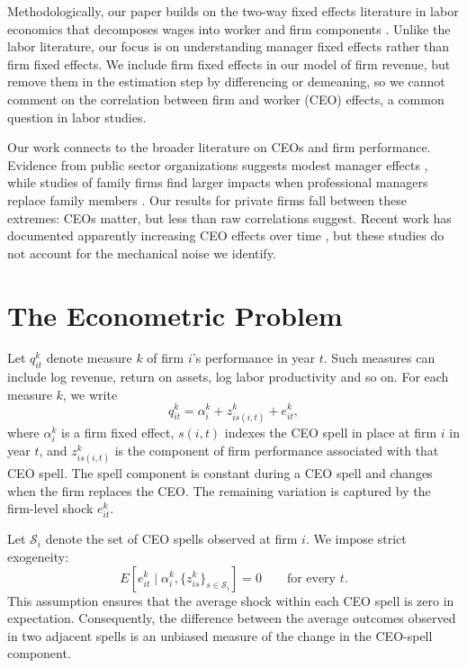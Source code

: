 \documentclass[11pt,a4paper]{article}
\begin{document}
Methodologically, our paper builds on the two-way fixed effects literature in labor economics that decomposes wages into worker and firm components \citep{Abowd1999Econometrica, Card2018JoLE}. Unlike the labor literature, our focus is on understanding manager fixed effects rather than firm fixed effects. We include firm fixed effects in our model of firm revenue, but remove them in the estimation step by differencing or demeaning, so we cannot comment on the correlation between firm and worker (CEO) effects, a common question in labor studies.

Our work connects to the broader literature on CEOs and firm performance. Evidence from public sector organizations suggests modest manager effects \citep{fenizia2022managers, janke2024role}, while studies of family firms find larger impacts when professional managers replace family members \citep{bennedsen2007inside, sraer2007performance}. Our results for private firms fall between these extremes: CEOs matter, but less than raw correlations suggest. Recent work has documented apparently increasing CEO effects over time \citep{quigley2015has}, but these studies do not account for the mechanical noise we identify. 


\section{The Econometric Problem}
\label{sec:econometric_problem}

Let $q_{it}^{k}$ denote measure $k$ of firm $i$'s performance in year
$t$. Such measures can include log
revenue, return on assets, log labor productivity and so on. For each measure
$k$, we write
\begin{equation}
q_{it}^{k}
=
\alpha_i^{k}
+
z_{is(i,t)}^{k}
+
e_{it}^{k},
\label{eq:outcome_model}
\end{equation}
where $\alpha_i^{k}$ is a firm fixed effect, $s(i,t)$ indexes the CEO
spell in place at firm $i$ in year $t$, and $z_{is(i,t)}^{k}$ is the
component of firm performance associated with that CEO spell. The spell component is constant during a CEO spell and changes when the firm replaces the CEO. The remaining variation is captured by the firm-level
shock $e_{it}^{k}$.

Let $\mathcal S_i$ denote the set of CEO spells observed at firm $i$.
We impose strict exogeneity:
\begin{equation}
E\!\left[
e_{it}^{k}
\mid
\alpha_i^{k},
\{z_{is}^{k}\}_{s\in\mathcal S_i}
\right]
=
0
\qquad
\text{for every }t.
\label{eq:strict_exogeneity}
\end{equation}
This assumption ensures that the average shock within each CEO spell is
zero in expectation. Consequently, the difference between the average
outcomes observed in two adjacent spells is an unbiased measure of the
change in the CEO-spell component.
\end{document}
